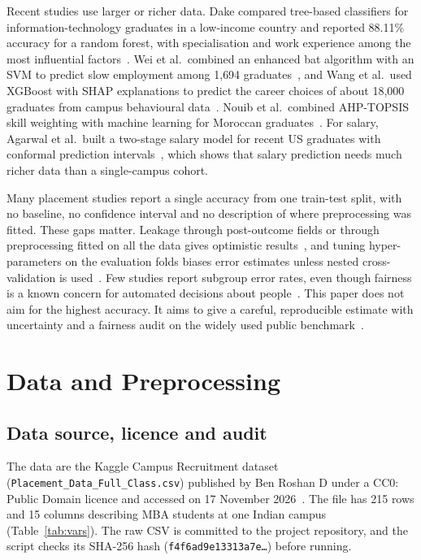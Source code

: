 \documentclass[runningheads]{llncs}
\begin{document}
Recent studies use larger or richer data. Dake compared tree-based classifiers for information-technology graduates in a low-income country and reported 88.11\% accuracy for a random forest, with specialisation and work experience among the most influential factors~\cite{dake}. Wei et al.\ combined an enhanced bat algorithm with an SVM to predict slow employment among 1{,}694 graduates~\cite{wei}, and Wang et al.\ used XGBoost with SHAP explanations to predict the career choices of about 18{,}000 graduates from campus behavioural data~\cite{wang}. Nouib et al.\ combined AHP-TOPSIS skill weighting with machine learning for Moroccan graduates~\cite{nouib}. For salary, Agarwal et al.\ built a two-stage salary model for recent US graduates with conformal prediction intervals~\cite{agarwal}, which shows that salary prediction needs much richer data than a single-campus cohort.

Many placement studies report a single accuracy from one train-test split, with no baseline, no confidence interval and no description of where preprocessing was fitted. These gaps matter. Leakage through post-outcome fields or through preprocessing fitted on all the data gives optimistic results~\cite{kaufman}, and tuning hyper-parameters on the evaluation folds biases error estimates unless nested cross-validation is used~\cite{varma,cawley}. Few studies report subgroup error rates, even though fairness is a known concern for automated decisions about people~\cite{mehrabi,hardt}. This paper does not aim for the highest accuracy. It aims to give a careful, reproducible estimate with uncertainty and a fairness audit on the widely used public benchmark~\cite{dataset}.

\section{Data and Preprocessing}\label{sec:data}
\subsection{Data source, licence and audit}
The data are the Kaggle Campus Recruitment dataset (\texttt{Placement\_Data\_Full\_Class.csv}) published by Ben Roshan D under a CC0: Public Domain licence and accessed on 17 November 2026~\cite{dataset}. The file has 215 rows and 15 columns describing MBA students at one Indian campus (Table~\ref{tab:vars}). The raw CSV is committed to the project repository, and the script checks its SHA-256 hash (\texttt{f4f6ad9e13313a7e\dots}) before running.
\end{document}
